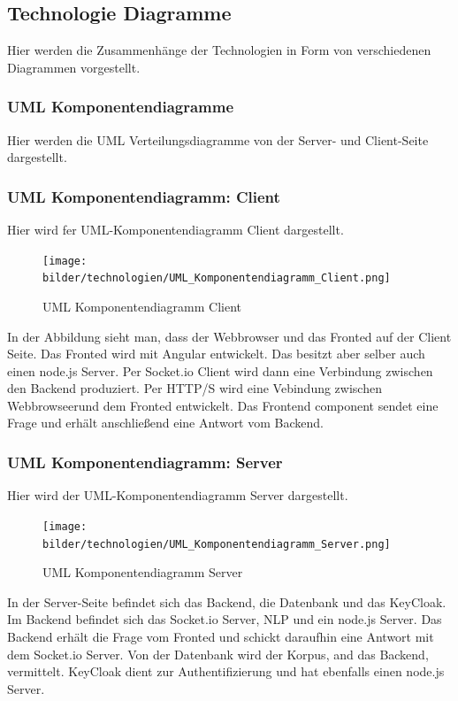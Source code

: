 \newpage
\subsection{Technologie Diagramme}
 Hier werden die Zusammenhänge der Technologien in Form von verschiedenen Diagrammen vorgestellt.

\subsubsection{UML Komponentendiagramme}
Hier werden die UML Verteilungsdiagramme von der Server- und Client-Seite dargestellt.

\subsubsection{UML Komponentendiagramm: Client}
Hier wird fer UML-Komponentendiagramm Client dargestellt.

\begin{figure}[H]
    \centering
    \texttt{[image: bilder/technologien/UML\_Komponentendiagramm\_Client.png]}
    \caption{UML Komponentendiagramm Client}
    \label{fig:UML Komponentendiagramm Client}
    \end{figure}
\noindent In der Abbildung sieht man, dass der Webbrowser und das Fronted auf der Client Seite.
Das Fronted wird mit Angular entwickelt. Das besitzt aber selber auch einen node.js Server.
Per Socket.io Client wird dann eine Verbindung zwischen den Backend produziert. Per HTTP/S
wird eine Vebindung zwischen Webbrowseerund dem Fronted entwickelt. Das Frontend component 
sendet eine Frage und erhält anschließend eine Antwort vom Backend.   

\newpage

\subsubsection{UML Komponentendiagramm: Server}
Hier wird der UML-Komponentendiagramm Server dargestellt.

\begin{figure}[H]
    \centering
    \texttt{[image: bilder/technologien/UML\_Komponentendiagramm\_Server.png]}
    \caption{UML Komponentendiagramm Server}
    \label{fig:UML Komponentendiagramm Server}
    \end{figure}
\noindent In der Server-Seite befindet sich das Backend, die Datenbank und das KeyCloak.
Im Backend befindet sich das Socket.io Server, NLP und ein node.js Server.
Das Backend erhält die Frage vom Fronted und schickt daraufhin eine Antwort mit dem Socket.io Server.
Von der Datenbank wird der Korpus, and das Backend, vermittelt. KeyCloak dient zur Authentifizierung und
hat ebenfalls einen node.js Server. 

